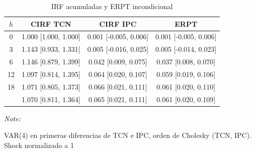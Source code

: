 \begin{table}[!h]
\centering
\caption{IRF acumuladas y ERPT incondicional}
\centering
\begin{threeparttable}
\begin{tabular}[t]{cccc}
\toprule
$h$ & CIRF TCN & CIRF IPC & ERPT\\
\midrule
0 & 1.000 [1.000, 1.000] & 0.001 [-0.005, 0.006] & 0.001 [-0.005, 0.006]\\
3 & 1.143 [0.933, 1.331] & 0.005 [-0.016, 0.025] & 0.005 [-0.014, 0.023]\\
6 & 1.146 [0.879, 1.399] & 0.042 [0.009, 0.075] & 0.037 [0.008, 0.070]\\
12 & 1.097 [0.814, 1.395] & 0.064 [0.020, 0.107] & 0.059 [0.019, 0.106]\\
18 & 1.071 [0.805, 1.373] & 0.066 [0.021, 0.111] & 0.061 [0.020, 0.110]\\
\addlinespace
24 & 1.070 [0.811, 1.364] & 0.065 [0.021, 0.111] & 0.061 [0.020, 0.109]\\
\bottomrule
\end{tabular}
\begin{tablenotes}
\item \textit{Note: } 
\item VAR(4) en primeras diferencias de TCN e IPC, orden de Cholesky (TCN, IPC). Shock normalizado a 1%
\end{tablenotes}
\end{threeparttable}
\end{table}